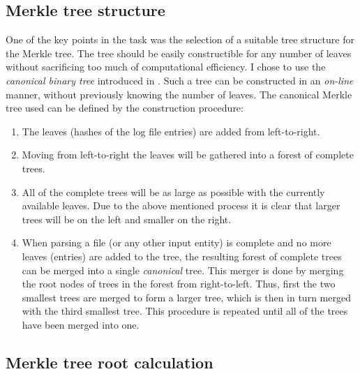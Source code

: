 \documentclass[11pt]{article}
\begin{document}
\subsection{Merkle tree structure} %
\label{sub:merkle_tree_structure}

One of the key points in the task was the selection of a suitable tree structure for the Merkle tree. The tree should be easily constructible for any number of leaves without sacrificing too much of computational efficiency. I chose to use the \emph{canonical binary tree} introduced in \cite{Buldas2014}. Such a tree can be constructed in an \emph{on-line} manner, without previously knowing the number of leaves. The canonical Merkle tree used can be defined by the construction procedure:

\begin{enumerate}
 	
 	\item The leaves (hashes of the log file entries) are added from left-to-right.
 	
 	\item Moving from left-to-right the leaves will be gathered into a forest of complete trees.
 	
 	\item All of the complete trees will be as large as possible with the currently available leaves. Due to the above mentioned process it is clear that larger trees will be on the left and smaller on the right.

 	\item When parsing a file (or any other input entity) is complete and no more leaves (entries) are added to the tree, the resulting forest of complete trees can be merged into a single \emph{canonical} tree. This merger is done by merging the root nodes of trees in the forest from right-to-left. Thus, first the two smallest trees are merged to form a larger tree, which is then in turn merged with the third smallest tree. This procedure is repeated until all of the trees have been merged into one.

\end{enumerate}


\subsection{Merkle tree root calculation} %
\label{sub:merkle_tree_root_calculation}
\end{document}
